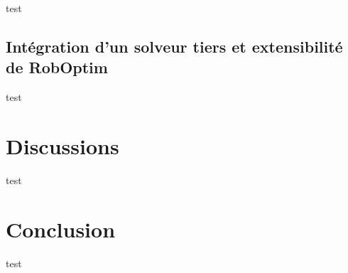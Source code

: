test

\subsection{Intégration d'un solveur tiers et extensibilité de RobOptim}

test

\section{Discussions}

test

\section{Conclusion}

test
